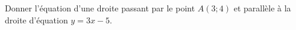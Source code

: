 
\begin{exercice}\label{exosmath-0677}

    Donner l'équation d'une droite passant par le point \( A(3;4)\) et parallèle à la droite d'équation \( y=3x-5\).

\end{exercice}
